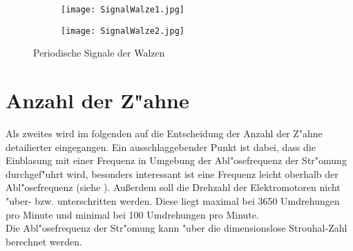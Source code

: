 \begin{figure}[h]
	\centering
	\begin{subfigure}[c]{0.5\textwidth}		
		\texttt{[image: SignalWalze1.jpg]}
	\end{subfigure}
	\begin{subfigure}[c]{0.5\textwidth}
		\texttt{[image: SignalWalze2.jpg]}
	\end{subfigure}
	\caption{Periodische Signale der Walzen}
	\label{fig:signal}
\end{figure}


\newpage
\section{Anzahl der Z"ahne}
Als zweites wird im folgenden auf die Entscheidung der Anzahl der Z"ahne detailierter eingegangen. Ein ausschlaggebender Punkt ist dabei, dass die Einblasung mit einer Frequenz in Umgebung der Abl"osefrequenz der Str"omung durchgef"uhrt wird, besonders interessant ist eine Frequenz leicht oberhalb der Abl"osefrequenz (siehe \cite{Oswald.2017}). Au\ss{}erdem soll die Drehzahl der Elektromotoren nicht "uber- bzw. unterschritten werden. Diese liegt maximal bei 3650 Umdrehungen pro Minute und minimal bei 100 Umdrehungen pro Minute.\\
Die Abl"osefrequenz der Str"omung kann "uber die dimensionslose Strouhal-Zahl berechnet werden. 






